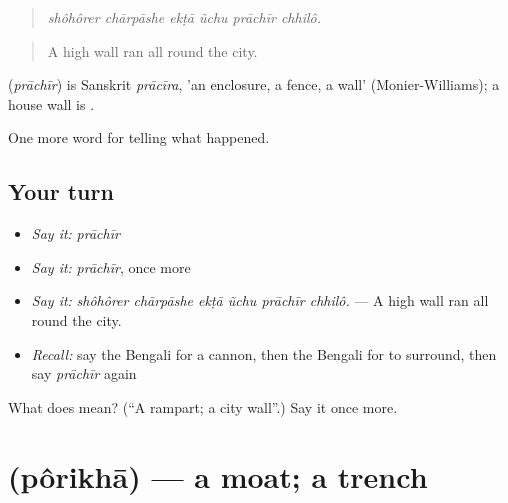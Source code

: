 \begin{quote}
     
\end{quote}

\begin{quote}
\emph{shôhôrer chārpāshe ekṭā ũchu prāchīr chhilô.}
\end{quote}

\begin{quote}
A high wall ran all round the city.
\end{quote}

\begin{cousinweb}
\textbf{} (\emph{prāchīr}) is Sanskrit \emph{prācīra}, 'an enclosure, a fence, a wall' (Monier-Williams); a house wall is \textbf{}.
\end{cousinweb}

\begin{grammarlens}[title={What you've built}]
One more word for telling what happened.
\end{grammarlens}

\subsection*{Your turn}
\begin{itemize}
\raggedright
  \item \emph{Say it:} \emph{prāchīr}
  \item \emph{Say it:} \emph{prāchīr}, once more
  \item \emph{Say it:} \emph{shôhôrer chārpāshe ekṭā ũchu prāchīr chhilô.} — A high wall ran all round the city.
  \item \emph{Recall:} say the Bengali for a cannon, then the Bengali for to surround, then say \emph{prāchīr} again
\end{itemize}

\begin{tcolorbox}[breakable,colback=teal!4,colframe=teal!35!black,title={Before you move on}]
What does  mean? (\textquotedblleft{}A rampart; a city wall\textquotedblright{}.) Say it once more.
\end{tcolorbox}
\section[\texorpdfstring{\bn{পরিখা} (pôrikhā)}{পরিখা (pôrikhā)}]{ (pôrikhā) — a moat; a trench}

\label{lesson:BN-C316-porikha}



